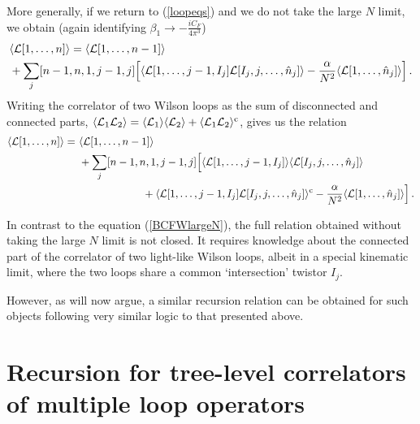 \documentclass[12pt]{article}
\numberwithin{equation}{section}
\begin{document}
More generally, if we return to (\ref{loopeqs}) and we do not take the large $N$ limit, we obtain (again identifying $\beta_1 \rightarrow -\frac{iC_F}{4\pi^3}$)
\begin{align}
&\langle \mathcal{L}[1,\ldots,n] \rangle = \langle \mathcal{L}[1,\ldots,n-1]\rangle  \notag \\ 
&+\sum_j [n-1,n,1,j-1,j] \Bigl[\langle \mathcal{L}[1,\ldots,j-1,I_j]  \mathcal{L}[I_j,j,\ldots,\hat{n}_j]\rangle -\frac{\alpha}{N^2} \langle \mathcal{L}[1,\ldots,\hat{n}_j] \rangle \Bigr]\,. 
\label{colourexactoneWL0}
\end{align}
Writing the correlator of two Wilson loops as the sum of disconnected and connected parts, $\langle \mathcal{L}_1 \mathcal{L}_2 \rangle = \langle \mathcal{L}_1 \rangle  \langle \mathcal{L}_2 \rangle + \langle \mathcal{L}_1 \mathcal{L}_2 \rangle^{\rm c}$, gives us the relation 
\begin{align}
\langle \mathcal{L}[1,\ldots,n] \rangle =\,\,  &\langle \mathcal{L}[1,\ldots,n-1]\rangle \label{colourexactoneWL} \\ &+ \sum_j [n-1,n,1,j-1,j] \Bigl[\langle \mathcal{L}[1,\ldots,j-1,I_j] \rangle \langle \mathcal{L}[I_j,j,\ldots,\hat{n}_j]\rangle \notag \\
&\qquad\qquad\qquad +\langle \mathcal{L}[1,\ldots,j-1,I_j]  \mathcal{L}[I_j,j,\ldots,\hat{n}_j]\rangle^{\rm c} -\frac{\alpha}{N^2} \langle \mathcal{L}[1,\ldots,\hat{n}_j] \rangle \Bigr]\,. \notag
\end{align}

In contrast to the equation (\ref{BCFWlargeN}), the full relation obtained without taking the large $N$ limit is not closed. It requires knowledge about the connected part of the correlator of two light-like Wilson loops, albeit in a special kinematic limit, where the two loops share a common `intersection' twistor $I_j$.

However, as will now argue, a similar recursion relation can be obtained for such objects following very similar logic to that presented above.


\section{Recursion for tree-level correlators of multiple loop operators}
\label{2WLrecursion}
\end{document}
